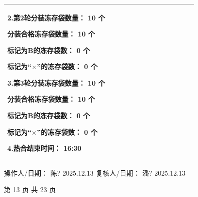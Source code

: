 \documentclass[UTF8,10pt,a4paper,fontset=fandol]{ctexart}
\newcommand{\fieldvalue}[1]{#1}
\newcommand{\handwritten}[1]{#1}
\begin{document}
\begin{center}
\begin{tabular}{|p{0.55\linewidth}|p{0.37\linewidth}|}
\begin{minipage}[t]{\linewidth}
2.第2轮分装冻存袋数量：
\fieldvalue{\handwritten{10}} 个

分装合格冻存袋数量：
\fieldvalue{\handwritten{10}} 个

标记为B的冻存袋数：
\fieldvalue{\handwritten{0}} 个

标记为“$\times$”的冻存袋数：
\fieldvalue{\handwritten{0}} 个

3.第3轮分装冻存袋数量：
\fieldvalue{\handwritten{10}} 个

分装合格冻存袋数量：
\fieldvalue{\handwritten{10}} 个

标记为B的冻存袋数：
\fieldvalue{\handwritten{0}} 个

标记为“$\times$”的冻存袋数：
\fieldvalue{\handwritten{0}} 个

4.热合结束时间：
\fieldvalue{\handwritten{16:30}}
\end{minipage}
\\
\hline
\end{tabular}
\end{center}

操作人/日期：
\fieldvalue{\handwritten{陈?}}
\quad
\fieldvalue{\handwritten{2025.12.13}}
\qquad
复核人/日期：
\fieldvalue{\handwritten{潘?}}
\quad
\fieldvalue{\handwritten{2025.12.13}}

\begin{center}
第 13 页 共 23 页
\end{center}

\newpage
\end{document}

